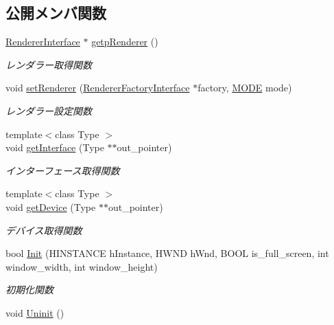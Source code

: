 \subsection*{公開メンバ関数}
\begin{DoxyCompactItemize}
\item 
\mbox{\hyperlink{class_renderer_interface}{Renderer\+Interface}} $\ast$ \mbox{\hyperlink{class_renderer_a1c49b796eff197f77ef3f75757f7d468}{getp\+Renderer}} ()
\begin{DoxyCompactList}\small\item\em レンダラー取得関数 \end{DoxyCompactList}\item 
void \mbox{\hyperlink{class_renderer_a02e3c483b2c9d8024e51639a06159066}{set\+Renderer}} (\mbox{\hyperlink{class_renderer_factory_interface}{Renderer\+Factory\+Interface}} $\ast$factory, \mbox{\hyperlink{class_renderer_ab5a9379ccadcf2b3394c61cf8c835fec}{M\+O\+DE}} mode)
\begin{DoxyCompactList}\small\item\em レンダラー設定関数 \end{DoxyCompactList}\item 
{\footnotesize template$<$class Type $>$ }\\void \mbox{\hyperlink{class_renderer_ae7155d5c9df23afd21082c08931a2e72}{get\+Interface}} (Type $\ast$$\ast$out\+\_\+pointer)
\begin{DoxyCompactList}\small\item\em インターフェース取得関数 \end{DoxyCompactList}\item 
{\footnotesize template$<$class Type $>$ }\\void \mbox{\hyperlink{class_renderer_a0f82c27d785abaee2d8014ad56eddeba}{get\+Device}} (Type $\ast$$\ast$out\+\_\+pointer)
\begin{DoxyCompactList}\small\item\em デバイス取得関数 \end{DoxyCompactList}\item 
bool \mbox{\hyperlink{class_renderer_a8d576add80187f5be3f24ec6a8108100}{Init}} (H\+I\+N\+S\+T\+A\+N\+CE h\+Instance, H\+W\+ND h\+Wnd, B\+O\+OL is\+\_\+full\+\_\+screen, int window\+\_\+width, int window\+\_\+height)
\begin{DoxyCompactList}\small\item\em 初期化関数 \end{DoxyCompactList}\item 
void \mbox{\hyperlink{class_renderer_ae865246d6a04d467ac22458f6f5f69d4}{Uninit}} ()

\end{DoxyCompactItemize}
